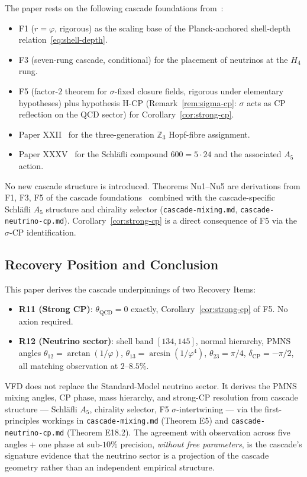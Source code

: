 \documentclass[12pt]{article}
\theoremstyle{definition}
\theoremstyle{remark}
\begin{document}
The paper rests on the following cascade foundations from~\citep{SmartXXXVI}:
\begin{itemize}
\item F1 ($r = \varphi$, rigorous) as the scaling base of the Planck-anchored shell-depth relation~\eqref{eq:shell-depth}.
\item F3 (seven-rung cascade, conditional) for the placement of neutrinos at the $H_4$ rung.
\item F5 (factor-$2$ theorem for $\sigma$-fixed closure fields, rigorous under elementary hypotheses) plus hypothesis H-CP (Remark~\ref{rem:sigma-cp}: $\sigma$ acts as CP reflection on the QCD sector) for Corollary~\ref{cor:strong-cp}.
\item Paper XXII~\citep{SmartXXII} for the three-generation $\mathbb{Z}_3$ Hopf-fibre assignment.
\item Paper XXXV~\citep{SmartXXXV} for the Schl\"afli compound $600 = 5 \cdot 24$ and the associated $A_5$ action.
\end{itemize}

No new cascade structure is introduced. Theorems Nu1--Nu5 are derivations from F1, F3, F5 of the cascade foundations~\citep{SmartXXXVI} combined with the cascade-specific Schl\"afli $A_5$ structure and chirality selector (\texttt{cascade-mixing.md}, \texttt{cascade-neutrino-cp.md}). Corollary~\ref{cor:strong-cp} is a direct consequence of F5 via the $\sigma$-CP identification.

\subsection{Recovery Position and Conclusion}

This paper derives the cascade underpinnings of two Recovery Items:
\begin{itemize}
\item \textbf{R11 (Strong CP)}: $\theta_{\mathrm{QCD}} = 0$ exactly, Corollary~\ref{cor:strong-cp} of F5. No axion required.
\item \textbf{R12 (Neutrino sector)}: shell band $[134, 145]$, normal hierarchy, PMNS angles $\theta_{12} = \arctan(1/\varphi)$, $\theta_{13} = \arcsin(1/\varphi^4)$, $\theta_{23} = \pi/4$, $\delta_{\mathrm{CP}} = -\pi/2$, all matching observation at $2$--$8.5\%$.
\end{itemize}

VFD does not replace the Standard-Model neutrino sector. It derives the PMNS mixing angles, CP phase, mass hierarchy, and strong-CP resolution from cascade structure --- Schl\"afli $A_5$, chirality selector, F5 $\sigma$-intertwining --- via the first-principles workings in \texttt{cascade-mixing.md} (Theorem E5) and \texttt{cascade-neutrino-cp.md} (Theorem E18.2). The agreement with observation across five angles + one phase at sub-$10\%$ precision, \emph{without free parameters}, is the cascade's signature evidence that the neutrino sector is a projection of the cascade geometry rather than an independent empirical structure.
\end{document}

